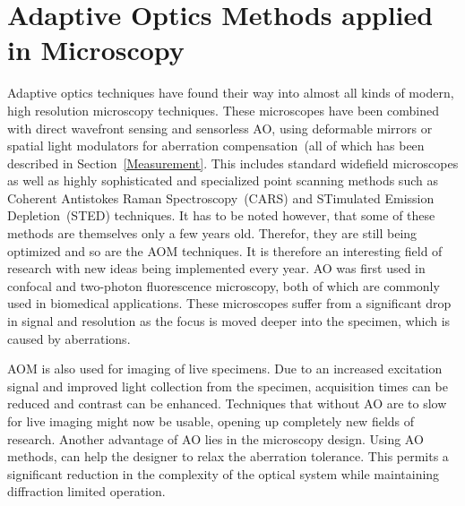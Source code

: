 
\section{Adaptive Optics Methods applied in Microscopy}
\label{sec:ExperimentDiscussion}

Adaptive optics techniques have found their way into almost all kinds of modern, high resolution microscopy techniques. These microscopes have been combined with direct wavefront sensing and sensorless AO, using deformable mirrors or spatial light modulators for aberration compensation~(all of which has been described in Section~\ref{Measurement}. This includes standard widefield microscopes as well as highly sophisticated and specialized point scanning methods such as Coherent Antistokes Raman Spectroscopy~(CARS) and STimulated Emission Depletion~(STED) techniques. It has to be noted however, that some of these methods are themselves only a few years old. Therefor, they are still being optimized and so are the AOM techniques. It is therefore an interesting field of research with new ideas being implemented every year.\newline
AO was first used in confocal and two-photon fluorescence microscopy, both of which are commonly used in biomedical applications. These microscopes suffer from a significant drop in signal and resolution as the focus is moved deeper into the specimen, which is caused by aberrations.\cite{characterizing_abberations}

AOM is also used for imaging of live specimens. Due to an increased excitation signal and improved light collection from the specimen, acquisition times can be reduced and contrast can be enhanced. Techniques that without AO are to slow for live imaging might now be usable, opening up completely new fields of research. Another advantage of AO lies in the microscopy design. Using AO methods, can help the designer to relax the aberration tolerance. This permits a significant reduction in the complexity of the optical system while maintaining diffraction limited operation.

